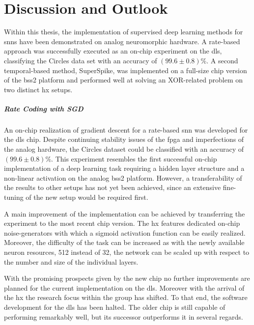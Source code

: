 \chapter{Discussion and Outlook}
\label{discussionandoutlook}
Within this thesis, the implementation of supervised deep learning methods for \glspl{snn} have been demonstrated on analog neuromorphic hardware. A rate-based approach was successfully executed as an on-chip experiment on the \gls{dls}, classifying the Circles data set with an accuracy of $(99.6 \pm 0.8) \%$. A second temporal-based method, SuperSpike, was implemented on a full-size chip version of the \gls{bss2} platform and performed well at solving an XOR-related problem on two distinct \gls{hx} setups.

\paragraph{Rate Coding with SGD} An on-chip realization of gradient descent for a rate-based \gls{snn} was developed for the \gls{dls} chip. Despite continuing stability issues of the \gls{fpga} and imperfections of the analog hardware, the Circles dataset could be classified with an accuracy of $(99.6 \pm 0.8) \%$. This experiment resembles the first successful on-chip implementation of a deep learning task requiring a hidden layer structure and a non-linear activation on the analog \gls{bss2} platform. However, a transferability of the results to other setups has not yet been achieved, since an extensive fine-tuning of the new setup would be required first.

A main improvement of the implementation can be achieved by transferring the experiment to the most recent chip version. The \gls{hx} features dedicated on-chip noise-generators with which a sigmoid activation function can be easily realized. Moreover, the difficulty of the task can be increased as with the newly available neuron resources, 512 instead of 32, the network can be scaled up with respect to the number and size of the individual layers.

With the promising prospects given by the new chip no further improvements are planned for the current implementation on the \gls{dls}. Moreover with the arrival of the \gls{hx} the research focus within the group has shifted. To that end, the software development for the \gls{dls} has been halted. The older chip is still capable of performing remarkably well, but its successor outperforms it in several regards.

